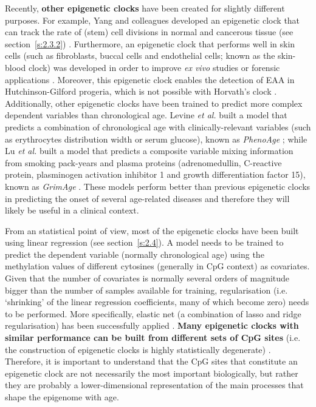Recently, \textbf{other epigenetic clocks} have been created for slightly different purposes. For example, Yang and colleagues developed an epigenetic clock that can track the rate of (stem) cell divisions in normal and cancerous tissue (see section~\ref{s:2.3.2}) \cite{Yang2016}. Furthermore, an epigenetic clock that performs well in skin cells (such as fibroblasts, buccal cells and endothelial cells; known as the skin-blood clock) was developed in order to improve \textit{ex vivo} studies or forensic applications \cite{Horvath2018a}. Moreover, this epigenetic clock enables the detection of \acrshort{EAA} in Hutchinson-Gilford progeria, which is not possible with Horvath's clock \cite{Horvath2018a}. Additionally, other epigenetic clocks have been trained to predict more complex dependent variables than chronological age. Levine \textit{et al.} built a model that predicts a combination of chronological age with clinically-relevant variables (such as erythrocytes distribution width or serum glucose), known as \textit{PhenoAge} \cite{Levine2018}; while Lu \textit{et al.} built a model that predicts a composite variable mixing information from smoking pack-years and plasma proteins (adrenomedullin, C-reactive protein, plasminogen activation inhibitor 1 and growth differentiation factor 15), known as \textit{GrimAge} \cite{Lu2019}. These models perform better than previous epigenetic clocks in predicting the onset of several age-related diseases and therefore they will likely be useful in a clinical context.    

\bigskip

From an statistical point of view, most of the epigenetic clocks have been built using linear regression (see section~\ref{s:2.4}). A model needs to be trained to predict the dependent variable (normally chronological age) using the methylation values of different cytosines (generally in CpG context) as covariates. Given that the number of covariates is normally several orders of magnitude bigger than the number of samples available for training, regularisation (i.e. `shrinking' of the linear regression coefficients, many of which become zero) needs to be performed. More specifically, elastic net (a combination of lasso and ridge regularisation) has been successfully applied \cite{Friedman2010}. \textbf{Many epigenetic clocks with similar performance can be built from different sets of CpG sites} (i.e. the construction of epigenetic clocks is highly statistically degenerate) \cite{Thompson2018}. Therefore, it is important to understand that the CpG sites that constitute an epigenetic clock are not necessarily the most important biologically, but rather they are probably a lower-dimensional representation of the main processes that shape the epigenome with age.


